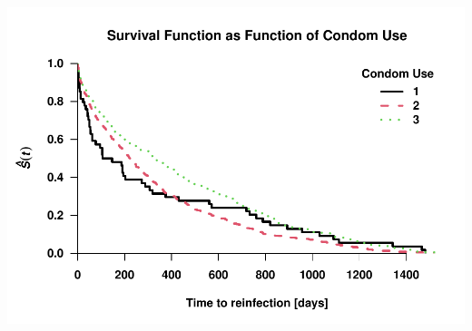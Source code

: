 \documentclass[
]{article}
\begin{document}
\includegraphics{practical_files/figure-latex/unnamed-chunk-7-1.pdf}
\end{document}
